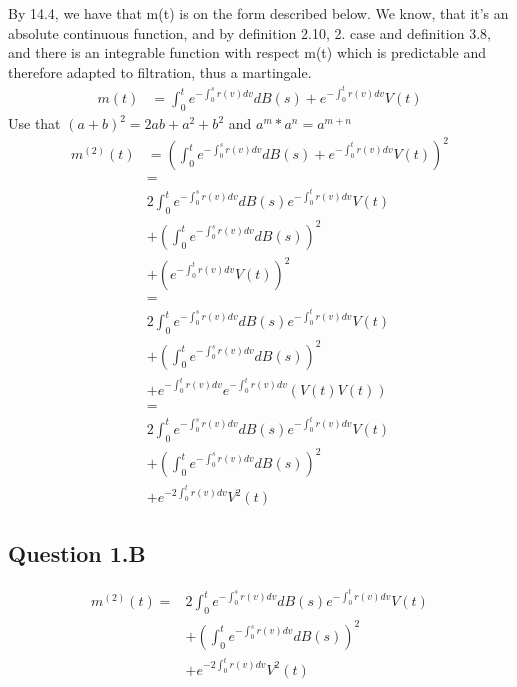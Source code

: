 \documentclass[12pt]{article}
\begin{document}
By 14.4, we have that m(t) is on the form described below.
We know, that it's an absolute continuous function, and by definition 2.10, 2. case and definition 3.8, and there is an integrable function with respect m(t) which is predictable and therefore adapted to filtration, thus a martingale.
\begin{equation}
\begin{split}
m(t) 	& = \int_0^t {e^{-\int_0^s {r(v) dv}}dB(s) 
+ e^{-\int_0^t {r(v) dv}}} V(t)
\end{split}
\end{equation}
Use that $(a+b)^2 = 2ab + a^2 + b^2$ and $a^m * a^n = a^{m+n}$
\begin{equation}
\begin{split}
m^{(2)}(t) 	& = (\int_0^t {e^{-\int_0^s {r(v) dv}}dB(s) 
+ e^{-\int_0^t {r(v) dv}}} V(t))^2 \\
 		& = \\
& 2 \int_0^t {e^{-\int_0^s {r(v) dv}}dB(s) e^{-\int_0^t {r(v) dv}}} V(t) \\
& + (\int_0^t {e^{-\int_0^s {r(v) dv}}dB(s)})^2 \\
& + (e^{-\int_0^t {r(v) dv}} V(t))^2  \\
 		& = \\
& 2 \int_0^t {e^{-\int_0^s {r(v) dv}}dB(s) e^{-\int_0^t {r(v) dv}}} V(t) \\
& + (\int_0^t {e^{-\int_0^s {r(v) dv}}dB(s)})^2 \\
& + e^{-\int_0^t {r(v) dv}} e^{-\int_0^t {r(v) dv}} (V(t) V(t)) \\
 		& = \\
& 2 \int_0^t {e^{-\int_0^s {r(v) dv}}dB(s) e^{-\int_0^t {r(v) dv}}} V(t) \\
& + (\int_0^t {e^{-\int_0^s {r(v) dv}}dB(s)})^2 \\
& + e^{-2\int_0^t {r(v) dv}} V^2(t)
\end{split}
\end{equation}

\subsection{Question 1.B}
\begin{equation}
\begin{split}
m^{(2)}(t) =
& 2 \int_0^t {e^{-\int_0^s {r(v) dv}}dB(s) e^{-\int_0^t {r(v) dv}}} V(t) \\
& + (\int_0^t {e^{-\int_0^s {r(v) dv}}dB(s)})^2 \\
& + e^{-2\int_0^t {r(v) dv}} V^2(t)
\end{split}
\end{equation}
\end{document}
